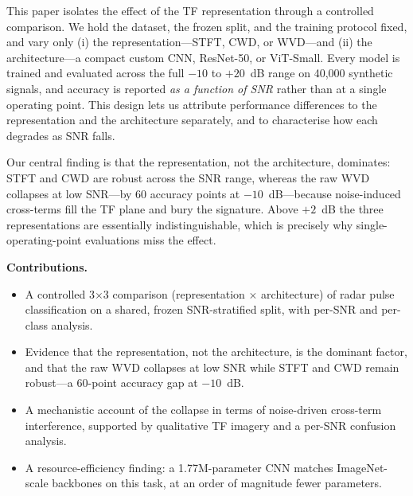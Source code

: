 \documentclass[journal]{IEEEtran}
\begin{document}
This paper isolates the effect of the TF representation through a controlled
comparison. We hold the dataset, the frozen split, and the training protocol
fixed, and vary only (i) the representation---STFT, CWD, or WVD---and (ii) the
architecture---a compact custom CNN, ResNet-50, or ViT-Small. Every model is
trained and evaluated across the full $-10$ to $+20$~dB range on 40{,}000
synthetic signals, and accuracy is reported \emph{as a function of SNR} rather
than at a single operating point. This design lets us attribute performance
differences to the representation and the architecture separately, and to
characterise how each degrades as SNR falls.

Our central finding is that the representation, not the architecture, dominates:
STFT and CWD are robust across the SNR range, whereas the raw WVD collapses at low
SNR---by 60 accuracy points at $-10$~dB---because noise-induced cross-terms fill
the TF plane and bury the signature. Above $+2$~dB the three representations are
essentially indistinguishable, which is precisely why single-operating-point
evaluations miss the effect.

\noindent\textbf{Contributions.}
\begin{itemize}
\item A controlled 3$\times$3 comparison (representation $\times$ architecture) of
radar pulse classification on a shared, frozen SNR-stratified split, with
per-SNR and per-class analysis.
\item Evidence that the representation, not the architecture, is the dominant
factor, and that the raw WVD collapses at low SNR while STFT and CWD remain
robust---a 60-point accuracy gap at $-10$~dB.
\item A mechanistic account of the collapse in terms of noise-driven cross-term
interference, supported by qualitative TF imagery and a per-SNR confusion
analysis.
\item A resource-efficiency finding: a 1.77M-parameter CNN matches ImageNet-scale
backbones on this task, at an order of magnitude fewer parameters.
\end{itemize}

\end{document}
